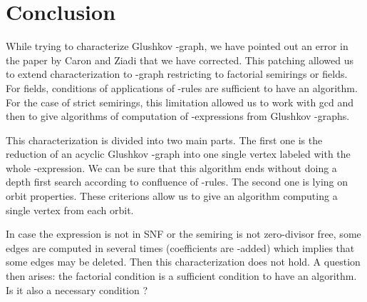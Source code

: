 \documentclass[11pt]{article}
\begin{document}
\section{Conclusion}
While trying to characterize Glushkov -graph, we have pointed out an error in the paper by Caron and Ziadi \cite{CZ97} that we have corrected. This patching allowed us to extend characterization to -graph restricting  to  factorial semirings or fields. For fields, conditions of applications of -rules are sufficient to have an algorithm.\\

For the case of strict semirings,
this limitation allowed us to work with {\sc gcd} and then to give algorithms of computation of -expressions from Glushkov -graphs. 

This characterization is divided into two main parts. The first one is the reduction of an acyclic Glushkov -graph into one single vertex labeled with the whole -expression. We can be sure that this algorithm ends without doing a depth first search according to confluence of -rules. The second one is lying on orbit properties. These criterions allow us to give an algorithm computing a single vertex from each orbit.

In case the expression is not in SNF or the semiring is not zero-divisor free, some edges are computed in  several times (coefficients are -added) which implies that some edges may be deleted. Then this characterization does not hold. A question then arises: the factorial condition is a sufficient condition to have an algorithm. Is it also a necessary condition ? 



{\small


}
\end{document}
